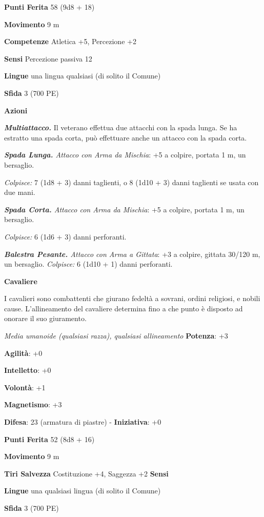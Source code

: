 \begin{multicols}{2}
\textbf{Punti Ferita} 58 (9d8 + 18)

\textbf{Movimento} 9 m

\textbf{Competenze} Atletica +5, Percezione +2

\textbf{Sensi} Percezione passiva 12

\textbf{Lingue} una lingua qualsiasi (di solito il Comune)

\textbf{Sfida} 3 (700 PE)\smallskip

\smallskip\textbf{Azioni}

\emph{\textbf{Multiattacco.}} Il veterano effettua due attacchi con la
spada lunga. Se ha estratto una spada corta, può effettuare anche un
attacco con la spada corta.

\emph{\textbf{Spada Lunga.} Attacco con Arma da Mischia}: +5 a colpire,
portata 1 m, un bersaglio.

\emph{Colpisce:} 7 (1d8 + 3) danni taglienti, o 8 (1d10 + 3) danni
taglienti se usata con due mani.

\emph{\textbf{Spada Corta.} Attacco con Arma da Mischia}: +5 a colpire,
portata 1 m, un bersaglio.

\emph{Colpisce:} 6 (1d6 + 3) danni perforanti.

\emph{\textbf{Balestra Pesante.} Attacco con Arma a Gittata}: +3 a
colpire, gittata 30/120 m, un bersaglio. \emph{Colpisce:} 6 (1d10 + 1)
danni perforanti.

\textbf{Cavaliere}

I cavalieri sono combattenti che giurano fedeltà a sovrani, ordini
religiosi, e nobili cause. L'allineamento del cavaliere determina fino a
che punto è disposto ad onorare il suo giuramento.

\emph{Media umanoide (qualsiasi razza), qualsiasi allineamento}
\textbf{Potenza}: +3

\textbf{Agilità}: +0

\textbf{Intelletto}: +0

\textbf{Volontà}: +1

\textbf{Magnetismo}: +3

\textbf{Difesa}: 23 (armatura di piastre) - \textbf{Iniziativa}: +0

\textbf{Punti Ferita} 52 (8d8 + 16)

\textbf{Movimento} 9 m

\textbf{Tiri Salvezza} Costituzione +4, Saggezza +2 \textbf{Sensi}


\textbf{Lingue} una qualsiasi lingua (di solito il Comune)

\textbf{Sfida} 3 (700 PE)\smallskip


\end{multicols}
